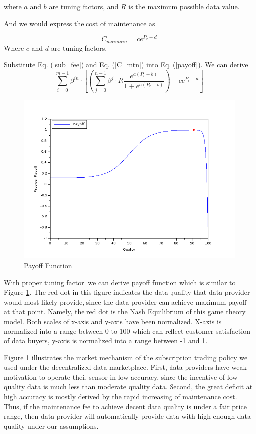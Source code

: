 \documentclass[journal,article,applsci,submit,moreauthors,pdftex]{Definitions/mdpi}
\begin{document}
where $a$ and $b$ are tuning factors, and $R$ is the maximum possible data value.

And we would express the cost of maintenance as

\begin{equation} \label{C_mtn}
    C_{maintain} = ce^{P_r - d}
\end{equation}
Where $c$ and $d$ are tuning factors.

Substitute Eq. (\ref{sub_fee}) and Eq. (\ref{C_mtn}) into Eq. (\ref{payoff}). We can derive
\begin{equation} \label{payoff_Pr}
    \sum_{i=0}^{m - 1}{\beta^{in}\cdot [(\sum_{j=0}^{n - 1} \beta^j \cdot R \frac{e^{a (P_r - b)}}{1 + e^{a (P_r - b)}}) - ce^{P_r - d}]}
\end{equation}

\begin{figure}[H] \centering \includegraphics[width=3.3 in]{payoff} \caption{Payoff Function}
    \label{fig:payoff} \end{figure}

With proper tuning factor, we can derive payoff function which is similar to Figure \ref{fig:payoff}. The red dot in this figure indicates the data quality that data provider would most likely provide, since the data provider can achieve maximum payoff at that point. Namely, the red dot is the Nash Equilibrium of this game theory model. Both scales of x-axis and y-axis have been normalized. X-axis is normalized into a range between 0 to 100 which can reflect customer satisfaction of data buyers, y-axis is normalized into a range between -1 and 1.

Figure \ref{fig:payoff} illustrates the market mechanism of the subscription trading policy we used under the decentralized data marketplace. First, data providers have weak motivation to operate their sensor in low accuracy, since the incentive of low quality data is much less than moderate quality data. Second, the great deficit at high accuracy is mostly derived by the rapid increasing of maintenance cost. Thus, if the maintenance fee to achieve decent data quality is under a fair price range, then data provider will automatically provide data with high enough data quality under our assumptions.
\end{document}
